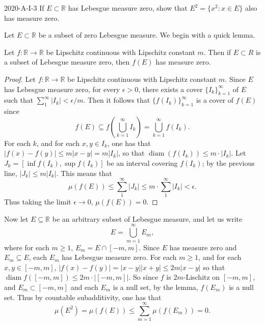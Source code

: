 \documentclass{article}
\begin{document}
	\begin{prb}{2020-A-I-3}
		If $E \subset \mathbb{R}$ has Lebesgue measure zero, show that $E^2 = \{x^2: x \in E\}$ also has measure zero. 
	\end{prb}
	Let $E \subset \mathbb{R}$ be a subset of zero Lebesgue measure. We begin with a quick lemma. 
	\begin{lemma}
		Let $f: \mathbb{R} \to \mathbb{R}$ be Lipschitz continuous with Lipschitz constant $m$. Then if $E \subset R$ is a subset of Lebesgue measure zero, then $f(E)$ has measure zero. 
 	\end{lemma}
 	\begin{proof}
 		Let $f: \mathbb{R} \to \mathbb{R}$ be Lipschitz continuous with Lipschitz constant $m$. Since $E$ has Lebesgue measure zero, for every $\epsilon > 0$, there exists a cover $\{I_{k}\}_{k = 1}^{\infty}$ of $E$ such that $\sum_{1}^{\infty}|I_{k}| < \epsilon/m$. Then it follows that $\{f(I_{k})\}_{k =1}^{\infty}$ is a cover of $f(E)$ since 
 		\begin{equation*}
 			f(E) \subseteq f\left(\bigcup_{k = 1}^{\infty}I_{k}\right) = \bigcup_{k = 1}^{\infty}f(I_{k}). 
 		\end{equation*}
 		For each $k$, and for each $x, y \in I_{k}$, one has that $|f(x) - f(y)| \leq m |x - y| = m|I_{k}|$, so that $\operatorname{diam}(f(I_{k})) \leq m \cdot |I_{k}|$. Let $J_{k} = [\inf f(I_{k}), \sup f(I_{k})]$ be an interval covering $f(I_{k})$; by the previous line, $|J_{k}| \leq m|I_{k}|$. This means that 
 		\begin{equation*}
 			\mu(f(E)) \leq \sum_{1}^{\infty}|J_k| \leq m \cdot \sum_{1}^{\infty}|I_{k}| < \epsilon. 
 		\end{equation*}
 		Thus taking the limit $\epsilon \to 0$, $\mu(f(E)) = 0$. 
 	\end{proof}
 	Now let $E \subseteq \mathbb{R}$ be an arbitrary subset of Lebesgue measure, and let us write 
 	\begin{equation*}
 		E = \bigcup_{m = 1}^{\infty}E_{m}, 
 	\end{equation*}	
 	where for each $m \geq 1$, $E_{m} = E \cap [-m,m]$. Since $E$ has measure zero and $E_{m} \subseteq E$, each $E_{m}$ has Lebesgue measure zero. For each $m \geq 1$, and for each $x, y\in [-m,m]$, $|f(x) - f(y)| = |x - y||x + y| \leq 2m|x -y|$ so that $\operatorname{diam}{f([-m,m])} \leq 2m\cdot |[-m,m]|$. So since $f$ is $2m$-Lischitz on $[-m,m]$, and $E_{m} \subset [-m,m]$ and each $E_{m}$ is a null set, by the lemma, $f(E_m)$ is a null set. Thus by countable subadditivity, one has that 
 	\begin{equation*}
 		\mu(E^2) = \mu(f(E)) \leq \sum_{m = 1}^{\infty}\mu(f(E_{m})) = 0. 
 	\end{equation*}
 	
\end{document}
